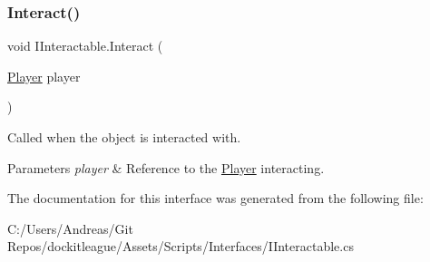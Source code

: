 \subsubsection{\texorpdfstring{Interact()}{Interact()}}
{\footnotesize\ttfamily void I\+Interactable.\+Interact (\begin{DoxyParamCaption}\item[{\hyperlink{class_player}{Player}}]{player }\end{DoxyParamCaption})}



Called when the object is interacted with. 


\begin{DoxyParams}{Parameters}
{\em player} & Reference to the \hyperlink{class_player}{Player} interacting.\\
\hline
\end{DoxyParams}


The documentation for this interface was generated from the following file\+:\begin{DoxyCompactItemize}
\item 
C\+:/\+Users/\+Andreas/\+Git Repos/dockitleague/\+Assets/\+Scripts/\+Interfaces/I\+Interactable.\+cs\end{DoxyCompactItemize}
